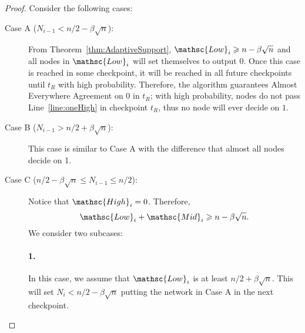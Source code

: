 \documentclass[leqno,11pt]{article}
\renewcommand{\ge}{\geqslant}
\renewcommand{\le}{\leqslant}
\newcommand{\lo}{{\mathsc{Low}}}
\newcommand{\hi}{{\mathsc{High}}}
\renewcommand{\mid}{{\mathsc{Mid}}}
\begin{document}
{\begin{proof}
Consider the following cases:
\begin{description}
	\item[Case A ($N_{i-1} < n/2 - \beta \sqrt{n}$):] From
    Theorem~\ref{thm:AdaptiveSupport}, $\lo_i \ge n - \beta \sqrt{n}$ and all
    nodes in $\lo_i$ will set themselves to output 0. Once this case is reached
    in some checkpoint, it will be reached in all future checkpoints until $t_R$
    with high probability.
    Therefore, the algorithm guarantees Almost Everywhere Agreement on 0 in
    $t_R$; with high probability, nodes do not pass Line~\ref{line:oneHigh}
    in checkpoint $t_R$, thus no node will ever decide on $1$.
	\item[Case B  ($N_{i-1} > n/2 + \beta \sqrt{n}$):] This case is similar to
    Case A with the difference that almost all nodes decide on 1.
	\item[Case C ($n/2 - \beta \sqrt{n} \le N_{i-1} \le n/2$):] Notice that $\hi_i = 0$. Therefore, 
\begin{equation}
\lo_i + \mid_i \ge n - \beta \sqrt{n}.
\label{eq:LoMid}
\end{equation}
		We consider two subcases: 
\paragraph{1.} In this case, we assume that $\lo_i$ is at least $n/2 + \beta \sqrt{n}$. This will set $N_i < n/2 - \beta \sqrt{n}$ putting the network in Case A in the next checkpoint.

\end{description}
\end{proof}}
\end{document}
